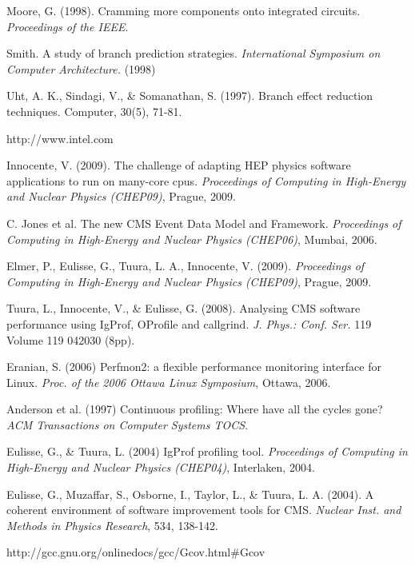 \documentclass[a4paper]{jpconf}
\def\mybibliostyle{plain}
\def\bibliocommand{}
\def\mybibliostyle{apa}
\begin{document}
\begin{thebibliography}{0}


Moore, G. (1998). Cramming more components onto integrated circuits. {\itshape Proceedings of the IEEE}.

Smith. A study of branch prediction strategies. {\itshape International Symposium on Computer Architecture.} (1998)

Uht, A. K., Sindagi, V., \& Somanathan, S. (1997). Branch effect reduction techniques. Computer, 30(5), 71-81.

http://www.intel.com

Innocente, V. (2009). The challenge of adapting HEP physics software applications to run on many-core cpus. {\itshape Proceedings of Computing in High-Energy and Nuclear Physics (CHEP09)}, Prague, 2009.

C. Jones et al. The new CMS Event Data Model and Framework. {\itshape Proceedings of Computing in High-Energy and Nuclear Physics (CHEP06)}, Mumbai, 2006.

Elmer, P., Eulisse, G., Tuura, L. A., Innocente, V. (2009). {\itshape Proceedings of Computing in High-Energy and Nuclear Physics (CHEP09)}, Prague, 2009.

Tuura, L., Innocente, V., \& Eulisse, G. (2008). Analysing CMS software performance using IgProf, OProfile and callgrind. {\itshape J. Phys.: Conf. Ser.} 119 Volume 119 042030 (8pp).

Eranian, S. (2006) Perfmon2: a flexible performance monitoring interface for Linux. {\itshape Proc. of the 2006 Ottawa Linux Symposium}, Ottawa, 2006.

Anderson et al. (1997) Continuous profiling: Where have all the cycles gone? {\itshape ACM Transactions on Computer Systems TOCS}.

Eulisse, G., \& Tuura, L. (2004) IgProf profiling tool.
{\itshape Proceedings of Computing in High-Energy and Nuclear Physics (CHEP04)}, Interlaken, 2004.

Eulisse, G., Muzaffar, S., Osborne, I., Taylor, L., \& Tuura, L. A. (2004). A coherent environment of software improvement tools for CMS. {\itshape Nuclear Inst. and Methods in Physics Research}, 534, 138-142.

http://gcc.gnu.org/onlinedocs/gcc/Gcov.html#Gcov

\end{thebibliography}
		
%
%


\bibliocommand
\end{document}

